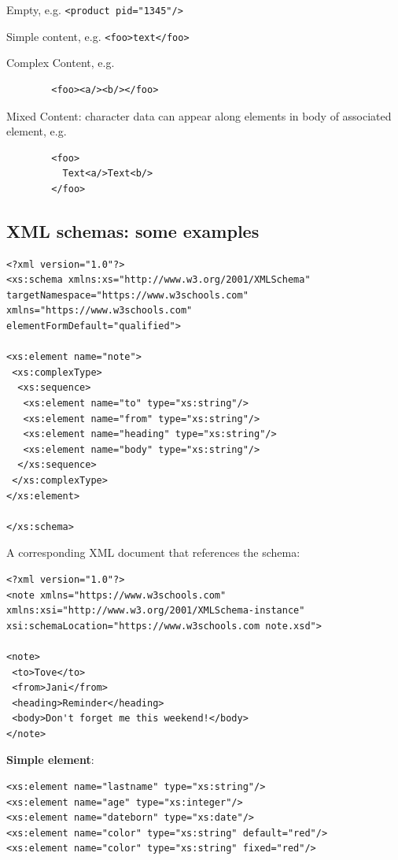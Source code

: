 \documentclass[11pt,oneside,a4paper]{article}
\begin{document}
\begin{compactitem}
	\item Empty, e.g. \verb|<product pid="1345"/> |
	\item Simple content, e.g. \verb|<foo>text</foo>|
	\item Complex Content, e.g.
	\begin{verbatim}
		<foo><a/><b/></foo>
	\end{verbatim}
	\item Mixed Content: character data can appear along elements in body of associated element, e.g.
	\begin{verbatim}
		<foo>
		  Text<a/>Text<b/>
		</foo>
	\end{verbatim}
\end{compactitem}

\subsection{XML schemas: some examples}

\lstset{language=XML}
\begin{lstlisting}
<?xml version="1.0"?>
<xs:schema xmlns:xs="http://www.w3.org/2001/XMLSchema"
targetNamespace="https://www.w3schools.com"
xmlns="https://www.w3schools.com"
elementFormDefault="qualified">

<xs:element name="note">
 <xs:complexType>
  <xs:sequence>
   <xs:element name="to" type="xs:string"/>
   <xs:element name="from" type="xs:string"/>
   <xs:element name="heading" type="xs:string"/>
   <xs:element name="body" type="xs:string"/>
  </xs:sequence>
 </xs:complexType>
</xs:element>

</xs:schema> 
\end{lstlisting}

A corresponding XML document that references the schema:

\lstset{language=XML}
\begin{lstlisting}
<?xml version="1.0"?>
<note xmlns="https://www.w3schools.com"
xmlns:xsi="http://www.w3.org/2001/XMLSchema-instance"
xsi:schemaLocation="https://www.w3schools.com note.xsd">

<note>
 <to>Tove</to>
 <from>Jani</from>
 <heading>Reminder</heading>
 <body>Don't forget me this weekend!</body>
</note> 
\end{lstlisting}

\textbf{Simple element}:

\lstset{language=XML}
\begin{lstlisting}
<xs:element name="lastname" type="xs:string"/>
<xs:element name="age" type="xs:integer"/>
<xs:element name="dateborn" type="xs:date"/>
<xs:element name="color" type="xs:string" default="red"/> 
<xs:element name="color" type="xs:string" fixed="red"/> 
\end{lstlisting}
\end{document}
